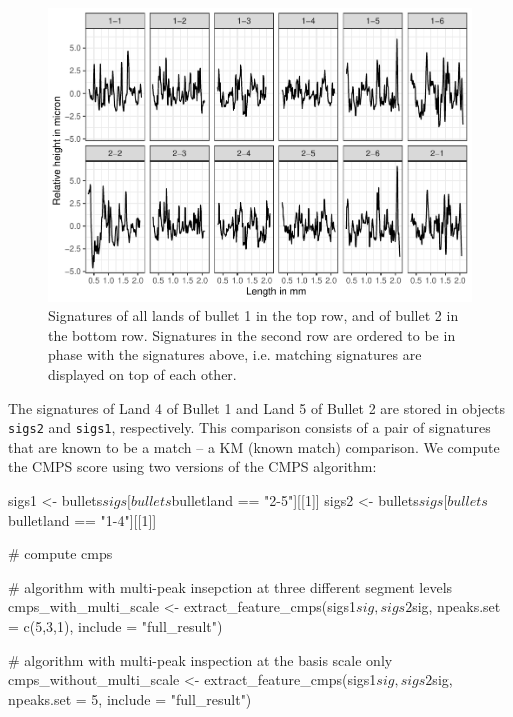 \begin{Schunk}
\begin{figure}

{\centering \includegraphics[width=\textwidth]{ju-hofmann_files/figure-latex/sigs-1} 

}

\caption[Signatures of all lands of bullet 1 in the top row, and of bullet 2 in the bottom row]{Signatures of all lands of bullet 1 in the top row, and of bullet 2 in the bottom row. Signatures in the second row are ordered to be in phase with the signatures above, i.e. matching signatures are displayed on top of each other.}\label{fig:sigs}
\end{figure}
\end{Schunk}

The signatures of Land 4 of Bullet 1 and Land 5 of Bullet 2 are stored
in objects \texttt{sigs2} and \texttt{sigs1}, respectively. This
comparison consists of a pair of signatures that are known to be a match
-- a KM (known match) comparison. We compute the CMPS score using two
versions of the CMPS algorithm:

\begin{Schunk}
\begin{Sinput}
sigs1 <- bullets$sigs[bullets$bulletland == "2-5"][[1]]
sigs2 <- bullets$sigs[bullets$bulletland == "1-4"][[1]]

# compute cmps

# algorithm with multi-peak insepction at three different segment levels
cmps_with_multi_scale <- 
  extract_feature_cmps(sigs1$sig, sigs2$sig, 
                       npeaks.set = c(5,3,1), include = "full_result")

# algorithm with multi-peak inspection at the basis scale only
cmps_without_multi_scale <- 
  extract_feature_cmps(sigs1$sig, sigs2$sig, 
                       npeaks.set = 5, include = "full_result")
\end{Sinput}
\end{Schunk}


